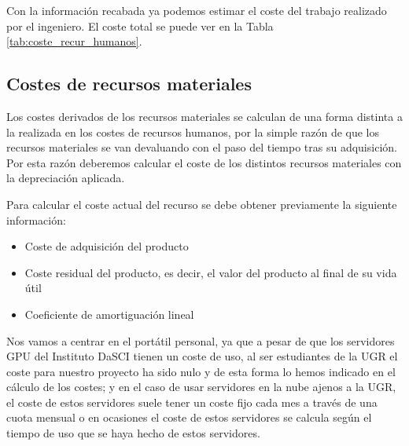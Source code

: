 Con la información recabada ya podemos estimar el coste del trabajo realizado por el ingeniero. El coste total se puede ver en la Tabla \ref{tab:coste_recur_humanos}.

\begin{table}[h]
\centering
{}
\caption{Costes asociados a los recursos humanos}
\label{tab:coste_recur_humanos}
\end{table}

\subsection{Costes de recursos materiales}

Los costes derivados de los recursos materiales se calculan de una forma distinta a la realizada en los costes de recursos humanos, por la simple razón de que los recursos materiales se van devaluando con el paso del tiempo tras su adquisición. Por esta razón deberemos calcular el coste de los distintos recursos materiales con la depreciación aplicada.

Para calcular el coste actual del recurso se debe obtener previamente la siguiente información:

\begin{itemize}
\item Coste de adquisición del producto
\item Coste residual del producto, es decir, el valor del producto al final de su vida útil
\item Coeficiente de amortiguación lineal
\end{itemize}

Nos vamos a centrar en el portátil personal, ya que a pesar de que los servidores GPU del Instituto DaSCI tienen un coste de uso, al ser estudiantes de la UGR el coste para nuestro proyecto ha sido nulo y de esta forma lo hemos indicado en el cálculo de los costes; y en el caso de usar servidores en la nube ajenos a la UGR, el coste de estos servidores suele tener un coste fijo cada mes a través de una cuota mensual o en ocasiones el coste de estos servidores se calcula según el tiempo de uso que se haya hecho de estos servidores.

